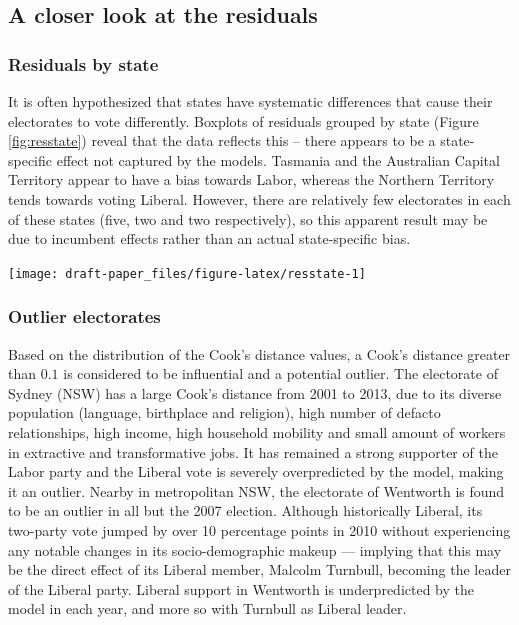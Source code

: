 \documentclass[11pt,a4paper,]{article}
\let\origfigure\figure
\let\endorigfigure\endfigure
\renewenvironment{figure}[1][2] {
    \expandafter\origfigure\expandafter[htbp]
} {
    \endorigfigure
}
\begin{document}
\subsection{A closer look at the
residuals}\label{a-closer-look-at-the-residuals}

\subsubsection{Residuals by state}\label{residuals-by-state}

It is often hypothesized that states have systematic differences that
cause their electorates to vote differently. Boxplots of residuals
grouped by state (Figure \ref{fig:resstate}) reveal that the data
reflects this -- there appears to be a state-specific effect not
captured by the models. Tasmania and the Australian Capital Territory
appear to have a bias towards Labor, whereas the Northern Territory
tends towards voting Liberal. However, there are relatively few
electorates in each of these states (five, two and two respectively), so
this apparent result may be due to incumbent effects rather than an
actual state-specific bias.

\begin{figure}[h]

{\centering \texttt{[image: draft-paper\_files/figure-latex/resstate-1]} 

}

\caption{Boxplot of residuals by state with jittered points. States ordered by median residual. A state-specific bias not captured by the model is evident.}\label{fig:resstate}
\end{figure}

\subsubsection{Outlier electorates}\label{outlier-electorates}

Based on the distribution of the Cook's distance values, a Cook's
distance greater than \(0.1\) is considered to be influential and a
potential outlier. The electorate of Sydney (NSW) has a large Cook's
distance from 2001 to 2013, due to its diverse population (language,
birthplace and religion), high number of defacto relationships, high
income, high household mobility and small amount of workers in
extractive and transformative jobs. It has remained a strong supporter
of the Labor party and the Liberal vote is severely overpredicted by the
model, making it an outlier. Nearby in metropolitan NSW, the electorate
of Wentworth is found to be an outlier in all but the 2007 election.
Although historically Liberal, its two-party vote jumped by over 10
percentage points in 2010 without experiencing any notable changes in
its socio-demographic makeup --- implying that this may be the direct
effect of its Liberal member, Malcolm Turnbull, becoming the leader of
the Liberal party. Liberal support in Wentworth is underpredicted by the
model in each year, and more so with Turnbull as Liberal leader.
\end{document}
